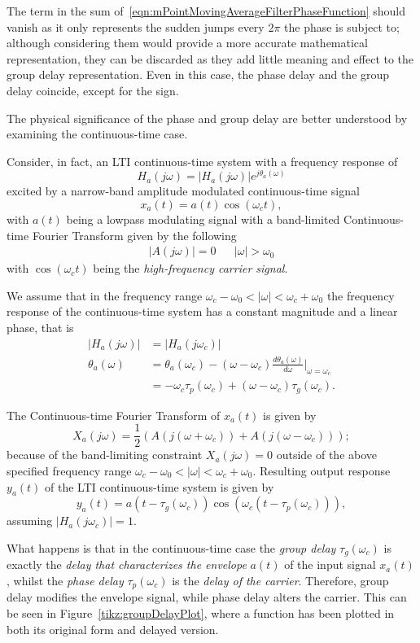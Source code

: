\documentclass[\documentfontsize, twocolumn]{\classname}
\begin{document}
The term in the sum of~\ref{eqn:mPointMovingAverageFilterPhaseFunction} should vanish as it only represents the sudden jumps every $2\pi$ the phase is subject to; although considering them would provide a more accurate mathematical representation, they can be discarded as they add little meaning and effect to the group delay representation. Even in this case, the phase delay and the group delay coincide, except for the sign.

The physical significance of the phase and group delay are better understood by examining the continuous-time case.

Consider, in fact, an LTI continuous-time system with a frequency response of 
\[
    H_a(j\omega) = \left|H_a(j\omega)\right|e^{j\theta_a(\omega)}
\]
excited by a narrow-band amplitude modulated continuous-time signal
\[
    x_a(t) = a(t) \cos{(\omega_c t)},
\]
with $a(t)$ being a lowpass modulating signal with a band-limited Continuous-time Fourier Transform given by the following
\begin{align*}
    \left|A(j\omega)\right| = 0 & &|\omega| > \omega_0
\end{align*}
with $\cos{(\omega_c t)}$ being the \emph{high-frequency carrier signal}.

We assume that in the frequency range $\omega_c - \omega_0 < |\omega| < \omega_c + \omega_0$ the frequency response of the continuous-time system has a constant magnitude and a linear phase, that is
\begin{align*}
    \left|H_a(j\omega)\right| &= \left|H_a(j\omega_c)\right|\\
    \theta_a(\omega) &= \theta_a(\omega_c) - (\omega - \omega_c)\frac{d\theta_a(\omega)}{d\omega}\Bigr\rvert_{\omega=\omega_c}\\
                     &= -\omega_c \tau_p(\omega_c) + (\omega - \omega_c)\tau_g(\omega_c).
\end{align*}

The Continuous-time Fourier Transform of $x_a(t)$ is given by
\[
    X_a(j\omega) = \frac 1 2\left(A(j(\omega + \omega_c)) + A(j(\omega - \omega_c))\right);
\]
because of the band-limiting constraint $X_a(j\omega) = 0$ outside of the above specified frequency range $\omega_c - \omega_0 < |\omega| < \omega_c + \omega_0$. Resulting output response $y_a(t)$ of the LTI continuous-time system is given by
\[
    y_a(t) = a(t - \tau_g(\omega_c))\cos{\left(\omega_c(t - \tau_p(\omega_c))\right)},
\]
assuming $\left|H_a(j\omega_c)\right| = 1$.

What happens is that in the continuous-time case the \emph{group delay} $\tau_g(\omega_c)$ is exactly the \emph{delay that characterizes the envelope} $a(t)$ of the input signal $x_a(t)$, whilst the \emph{phase delay} $\tau_p(\omega_c)$ is the \emph{delay of the carrier}. Therefore, group delay modifies the envelope signal, while phase delay alters the carrier. This can be seen in Figure~\ref{tikz:groupDelayPlot}, where a function has been plotted in both its original form and delayed version.
\end{document}
